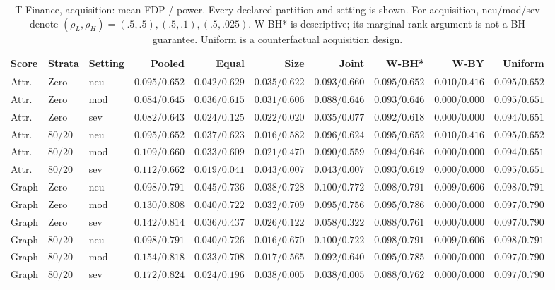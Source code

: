 \begin{table}[t]\centering\scriptsize\setlength{\tabcolsep}{3pt}
\caption{T-Finance, acquisition: mean FDP / power. Every declared partition and setting is shown. For acquisition, neu/mod/sev denote $(\rho_L,\rho_H)=(.5,.5),(.5,.1),(.5,.025)$. W-BH* is descriptive; its marginal-rank argument is not a BH guarantee. Uniform is a counterfactual acquisition design.}
\begin{tabular}{lllrrrrrrr}\toprule Score & Strata & Setting & Pooled & Equal & Size & Joint & W-BH* & W-BY & Uniform\\\midrule
Attr. & Zero & neu & $0.095/0.652$ & $0.042/0.629$ & $0.035/0.622$ & $0.093/0.660$ & $0.095/0.652$ & $0.010/0.416$ & $0.095/0.652$ \\
Attr. & Zero & mod & $0.084/0.645$ & $0.036/0.615$ & $0.031/0.606$ & $0.088/0.646$ & $0.093/0.646$ & $0.000/0.000$ & $0.095/0.651$ \\
Attr. & Zero & sev & $0.082/0.643$ & $0.024/0.125$ & $0.022/0.020$ & $0.035/0.077$ & $0.092/0.618$ & $0.000/0.000$ & $0.094/0.651$ \\
Attr. & 80/20 & neu & $0.095/0.652$ & $0.037/0.623$ & $0.016/0.582$ & $0.096/0.624$ & $0.095/0.652$ & $0.010/0.416$ & $0.095/0.652$ \\
Attr. & 80/20 & mod & $0.109/0.660$ & $0.033/0.609$ & $0.021/0.470$ & $0.090/0.559$ & $0.094/0.646$ & $0.000/0.000$ & $0.094/0.651$ \\
Attr. & 80/20 & sev & $0.112/0.662$ & $0.019/0.041$ & $0.043/0.007$ & $0.043/0.007$ & $0.093/0.619$ & $0.000/0.000$ & $0.095/0.651$ \\
Graph & Zero & neu & $0.098/0.791$ & $0.045/0.736$ & $0.038/0.728$ & $0.100/0.772$ & $0.098/0.791$ & $0.009/0.606$ & $0.098/0.791$ \\
Graph & Zero & mod & $0.130/0.808$ & $0.040/0.722$ & $0.032/0.709$ & $0.095/0.756$ & $0.095/0.786$ & $0.000/0.000$ & $0.097/0.790$ \\
Graph & Zero & sev & $0.142/0.814$ & $0.036/0.437$ & $0.026/0.122$ & $0.058/0.322$ & $0.088/0.761$ & $0.000/0.000$ & $0.097/0.790$ \\
Graph & 80/20 & neu & $0.098/0.791$ & $0.040/0.726$ & $0.016/0.670$ & $0.100/0.722$ & $0.098/0.791$ & $0.009/0.606$ & $0.098/0.791$ \\
Graph & 80/20 & mod & $0.154/0.818$ & $0.033/0.708$ & $0.017/0.565$ & $0.092/0.640$ & $0.095/0.785$ & $0.000/0.000$ & $0.097/0.790$ \\
Graph & 80/20 & sev & $0.172/0.824$ & $0.024/0.196$ & $0.038/0.005$ & $0.038/0.005$ & $0.088/0.762$ & $0.000/0.000$ & $0.097/0.790$ \\
\bottomrule\end{tabular}\end{table}

